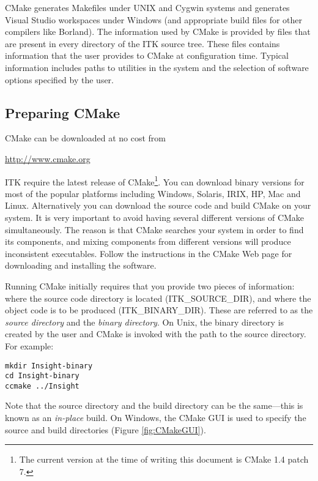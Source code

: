 CMake generates Makefiles under UNIX and Cygwin systems and generates Visual
Studio workspaces under Windows (and appropriate build files for other
compilers like Borland). The information used by CMake is provided by
 files that are present in every directory of the ITK
source tree. These files contains information that the user
provides to CMake at configuration time. Typical information includes paths
to utilities in the system and the selection of software options specified by
the user.

\subsection{Preparing CMake}
\label{sec:CMakeforITK}
 

CMake can be downloaded at no cost from 
\begin{center} 
  \url{http://www.cmake.org}
\end{center}

ITK require the latest release of CMake\footnote{The current version at the
time of writing this document is CMake 1.4 patch 7.}. You can download binary
versions for most of the popular platforms including Windows, Solaris, IRIX,
HP, Mac and Linux. Alternatively you can download the source code and build
CMake on your system. It is very important to avoid having several different
versions of CMake simultaneously. The reason is that CMake searches your
system in order to find its components, and mixing components from different
versions will produce inconsistent executables. Follow the instructions in the
CMake Web page for downloading and installing the software.

Running CMake initially requires that you provide two pieces of information:
where the source code directory is located (ITK\_SOURCE\_DIR), and where the
object code is to be produced (ITK\_BINARY\_DIR). These are referred to as the
\emph{source directory} and the \emph{binary directory}. On Unix, the binary
directory is created by the user and CMake is invoked with the path to the
source directory. For example:

\begin{verbatim}
mkdir Insight-binary
cd Insight-binary
ccmake ../Insight
\end{verbatim}

Note that the source directory and the build directory can be the
same---this is known as an \emph{in-place} build. On Windows, the CMake 
GUI is used to specify the source and build directories (Figure
\ref{fig:CMakeGUI}).

